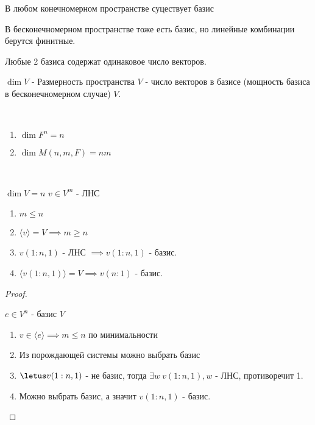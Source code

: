\begin{follow}
    В любом конечномерном пространстве суцествует базис
\end{follow}

\begin{notice}
    В бесконечномерном пространстве тоже есть базис, но линейные комбинации берутся финитные.
\end{notice}

\begin{follow}
    Любые 2 базиса содержат одинаковое число векторов.
\end{follow}

\begin{defn}
    $\dim{V}$ - Размерность пространства $V$ - число векторов в базисе (мощность базиса в бесконечномерном случае) $V$.
\end{defn}

\begin{example}~

    \begin{enumerate}
        \item $\dim{F^n} = n$
        \item $\dim{M(n, m, F) = nm}$
    \end{enumerate}
\end{example}

\begin{theorem-non}~


    $\dim V = n$
    $v \in V^m$ - ЛНС
    \begin{enumerate}
        \item $m \le n$
        \item $\langle v \rangle = V \implies m \ge n$
        \item $v(1:n,1)$ - ЛНС $\implies v(1:n,1)$ - базис.
        \item $\langle v(1:n,1) \rangle = V \implies v(n:1)$ - базис.
    \end{enumerate}
\end{theorem-non}

\begin{proof}~
    
    $e \in V^n$ - базис $V$
    \begin{enumerate}
        \item $v \in \langle e \rangle \implies m \le n$ по минимальности
        \item Из порождающей системы можно выбрать базис
        \item $\letus v(1:n,1)$ - не базис, тогда $\exists w ~ v(1:n,1), w$ - ЛНС, противоречит 1.
        \item Можно выбрать базис, а значит $v(1:n,1)$ - базис. 
    \end{enumerate}
\end{proof}

